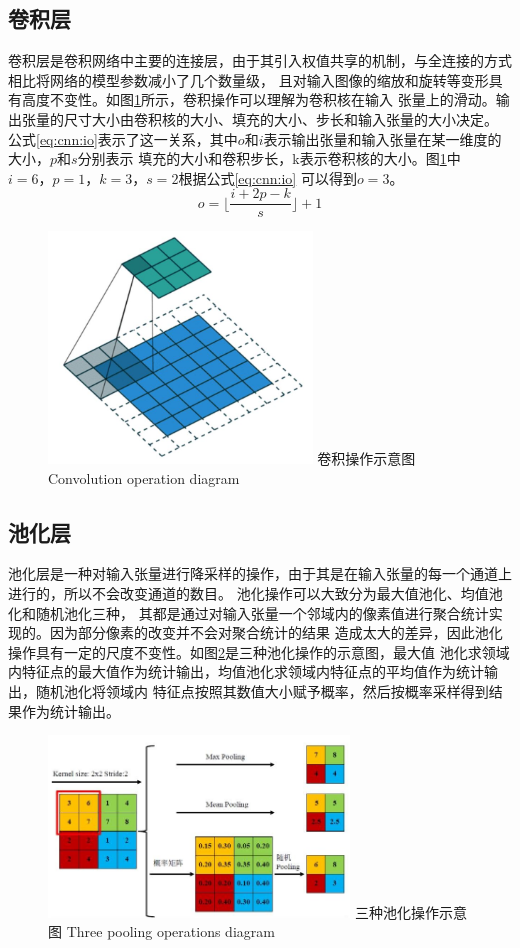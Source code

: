 \subsection{卷积层}
	卷积层是卷积网络中主要的连接层，由于其引入权值共享的机制，与全连接的方式相比将网络的模型参数减小了几个数量级，
	且对输入图像的缩放和旋转等变形具有高度不变性。如图\ref{fig:chap4:cnn-op}所示，卷积操作可以理解为卷积核在输入
	张量上的滑动。输出张量的尺寸大小由卷积核的大小、填充的大小、步长和输入张量的大小决定。
	公式\ref{eq:cnn:io}表示了这一关系，其中$o$和$i$表示输出张量和输入张量在某一维度的大小，$p$和$s$分别表示
	填充的大小和卷积步长，k表示卷积核的大小。图\ref{fig:chap4:cnn-op}中$i=6，p=1，k=3，s=2$根据公式\ref{eq:cnn:io}
	可以得到$o=3$。
	\begin{equation}
		o = \lfloor \frac{i+2p-k}{s} \rfloor +1 \label{eq:cnn:io}
	\end{equation}
	
	\begin{figure}[h]
	  \centering
	  \includegraphics[width=7cm]{figure/chap4/CNN-op.jpg}
	  \bicaption
		{卷积操作示意图}
		{Convolution operation diagram}
	  \label{fig:chap4:cnn-op}
	\end{figure}
\subsection{池化层}
	池化层是一种对输入张量进行降采样的操作，由于其是在输入张量的每一个通道上进行的，所以不会改变通道的数目。
	池化操作可以大致分为最大值池化、均值池化和随机池化三种，
	其都是通过对输入张量一个邻域内的像素值进行聚合统计实现的。因为部分像素的改变并不会对聚合统计的结果
	造成太大的差异，因此池化操作具有一定的尺度不变性。如图\ref{fig:pooling}是三种池化操作的示意图，最大值
	池化求领域内特征点的最大值作为统计输出，均值池化求领域内特征点的平均值作为统计输出，随机池化将领域内
	特征点按照其数值大小赋予概率，然后按概率采样得到结果作为统计输出。
	\begin{figure}[h]
	  \centering
	  \includegraphics[width=8cm]{figure/chap4/pooling.jpg}
	  \bicaption
		{三种池化操作示意图}
		{Three pooling operations diagram}
	  \label{fig:pooling}
	\end{figure}
